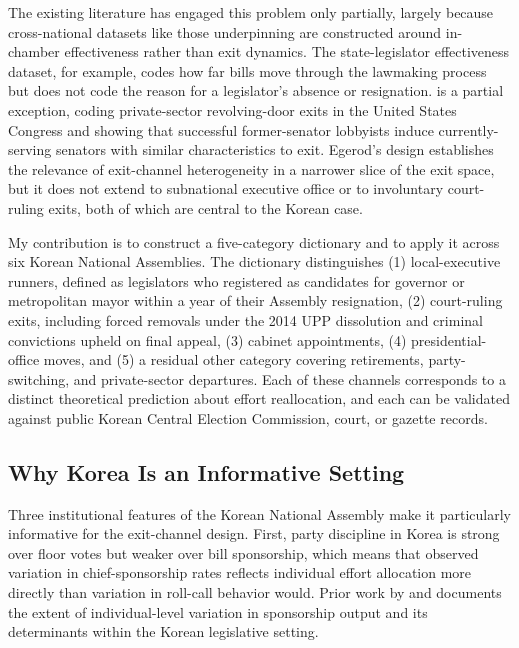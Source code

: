 \documentclass[11pt]{article}
\begin{document}
The existing literature has engaged this problem only partially, largely because cross-national datasets like those underpinning \citet{volden2024} are constructed around in-chamber effectiveness rather than exit dynamics. The \citet{volden2024} state-legislator effectiveness dataset, for example, codes how far bills move through the lawmaking process but does not code the reason for a legislator's absence or resignation. \citet{egerod2021} is a partial exception, coding private-sector revolving-door exits in the United States Congress and showing that successful former-senator lobbyists induce currently-serving senators with similar characteristics to exit. Egerod's design establishes the relevance of exit-channel heterogeneity in a narrower slice of the exit space, but it does not extend to subnational executive office or to involuntary court-ruling exits, both of which are central to the Korean case.

My contribution is to construct a five-category dictionary and to apply it across six Korean National Assemblies. The dictionary distinguishes (1) local-executive runners, defined as legislators who registered as candidates for governor or metropolitan mayor within a year of their Assembly resignation, (2) court-ruling exits, including forced removals under the 2014 UPP dissolution and criminal convictions upheld on final appeal, (3) cabinet appointments, (4) presidential-office moves, and (5) a residual other category covering retirements, party-switching, and private-sector departures. Each of these channels corresponds to a distinct theoretical prediction about effort reallocation, and each can be validated against public Korean Central Election Commission, court, or gazette records.

\subsection{Why Korea Is an Informative Setting}

Three institutional features of the Korean National Assembly make it particularly informative for the exit-channel design. First, party discipline in Korea is strong over floor votes but weaker over bill sponsorship, which means that observed variation in chief-sponsorship rates reflects individual effort allocation more directly than variation in roll-call behavior would. Prior work by \citet{ka2025} and \citet{an2025} documents the extent of individual-level variation in sponsorship output and its determinants within the Korean legislative setting.
\end{document}
